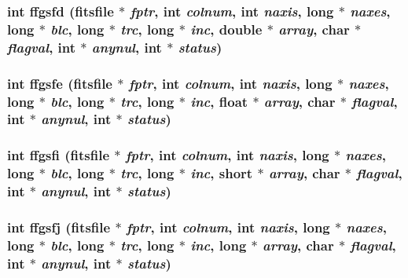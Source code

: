 \subsubsection{\setlength{\rightskip}{0pt plus 5cm}int ffgsfd (\bf{fitsfile} $\ast$ {\em fptr}, int {\em colnum}, int {\em naxis}, long $\ast$ {\em naxes}, long $\ast$ {\em blc}, long $\ast$ {\em trc}, long $\ast$ {\em inc}, double $\ast$ {\em array}, char $\ast$ {\em flagval}, int $\ast$ {\em anynul}, int $\ast$ {\em status})}\label{fitsio__64_8h_beeb182f75ceb2f94e28d9653b7fd612}


\subsubsection{\setlength{\rightskip}{0pt plus 5cm}int ffgsfe (\bf{fitsfile} $\ast$ {\em fptr}, int {\em colnum}, int {\em naxis}, long $\ast$ {\em naxes}, long $\ast$ {\em blc}, long $\ast$ {\em trc}, long $\ast$ {\em inc}, float $\ast$ {\em array}, char $\ast$ {\em flagval}, int $\ast$ {\em anynul}, int $\ast$ {\em status})}\label{fitsio__64_8h_a8b0872e27d9bd6b655586b7cbb4ab2a}


\subsubsection{\setlength{\rightskip}{0pt plus 5cm}int ffgsfi (\bf{fitsfile} $\ast$ {\em fptr}, int {\em colnum}, int {\em naxis}, long $\ast$ {\em naxes}, long $\ast$ {\em blc}, long $\ast$ {\em trc}, long $\ast$ {\em inc}, short $\ast$ {\em array}, char $\ast$ {\em flagval}, int $\ast$ {\em anynul}, int $\ast$ {\em status})}\label{fitsio__64_8h_64fe61a10be1e4a7891e611c2367811a}


\subsubsection{\setlength{\rightskip}{0pt plus 5cm}int ffgsfj (\bf{fitsfile} $\ast$ {\em fptr}, int {\em colnum}, int {\em naxis}, long $\ast$ {\em naxes}, long $\ast$ {\em blc}, long $\ast$ {\em trc}, long $\ast$ {\em inc}, long $\ast$ {\em array}, char $\ast$ {\em flagval}, int $\ast$ {\em anynul}, int $\ast$ {\em status})}\label{fitsio__64_8h_5fe7f8cf0ec4c375a0d8883974df5e3f}



